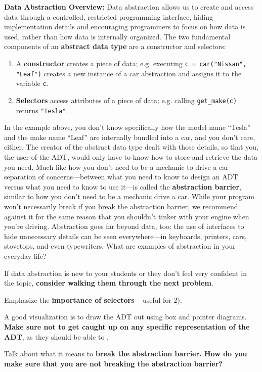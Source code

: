 \textbf{Data Abstraction Overview:}
Data abstraction allows us to create and access data through a controlled, restricted programming interface, hiding implementation details and encouraging programmers to focus on how data is used, rather than how data is internally organized. The two fundamental components of an \textbf{abstract data type} are a constructor and selectors:
\begin{enumerate}
	\item A \textbf{constructor} creates a piece of data; e.g. executing \texttt{c = car("Nissan", "Leaf")} creates a new instance of a car abstraction and assigns it to the variable \lstinline{c}.
	\item \textbf{Selectors} access attributes of a piece of data; e.g. calling \lstinline{get_make(c)} returns \lstinline{"Tesla"}.
\end{enumerate}

In the example above, you don't know specifically how the model name ``Tesla'' and the make name ``Leaf'' are internally bundled into a car, and you don't care, either. The creator of the abstract data type dealt with those details, so that you, the user of the ADT, would only have to know how to store and retrieve the data you need. Much like how you don't need to be a mechanic to drive a car separation of concerns---between what you need to know to design an ADT versus what you need to know to use it---is called the \textbf{abstraction barrier}, similar to how you don't need to be a mechanic drive a car. While your program won't necessarily break if you break the abstraction barrier, we recommend against it for the same reason that you shouldn't tinker with your engine when you're driving. Abstraction goes far beyond data, too: the use of interfaces to hide unnecessary details can be seen everywhere---in keyboards, printers, cars, stovetops, and even typewriters. What are examples of abstraction in your everyday life? 

\begin{meta}
If data abstraction is new to your students or they don't feel very confident in the topic, \textbf{consider walking them through the next problem}.

Emphasize the \textbf{importance of selectors} -- useful for 2).

A good visualization is to draw the ADT out using box and pointer diagrams. \textbf{Make sure not to get caught up on any specific representation of the ADT}, as they should be able to .

Talk about what it means to \textbf{break the abstraction barrier. How do you make sure that you are not breaking the abstraction barrier?}
\end{meta}
